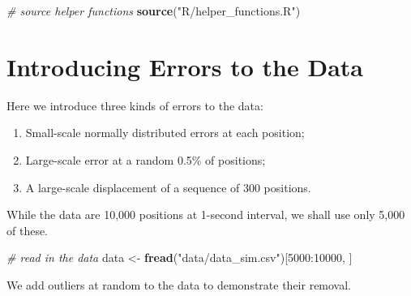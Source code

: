 \documentclass[
]{scrreprt}
\newenvironment{Shaded}{}{}
\newcommand{\CommentTok}[1]{\textcolor[rgb]{0.38,0.63,0.69}{\textit{#1}}}
\newcommand{\DecValTok}[1]{\textcolor[rgb]{0.25,0.63,0.44}{#1}}
\newcommand{\KeywordTok}[1]{\textcolor[rgb]{0.00,0.44,0.13}{\textbf{#1}}}
\newcommand{\NormalTok}[1]{#1}
\newcommand{\OperatorTok}[1]{\textcolor[rgb]{0.40,0.40,0.40}{#1}}
\newcommand{\StringTok}[1]{\textcolor[rgb]{0.25,0.44,0.63}{#1}}
\begin{document}
\begin{Shaded}
\begin{Highlighting}[]
\CommentTok{\# source helper functions}
\KeywordTok{source}\NormalTok{(}\StringTok{"R/helper\_functions.R"}\NormalTok{)}
\end{Highlighting}
\end{Shaded}

\hypertarget{introducing-errors-to-the-data}{%
\section{Introducing Errors to the Data}\label{introducing-errors-to-the-data}}

Here we introduce three kinds of errors to the data:

\begin{enumerate}
\def\labelenumi{\arabic{enumi}.}
\item
  Small-scale normally distributed errors at each position;
\item
  Large-scale error at a random 0.5\% of positions;
\item
  A large-scale displacement of a sequence of 300 positions.
\end{enumerate}

While the data are 10,000 positions at 1-second interval, we shall use only 5,000 of these.

\begin{Shaded}
\begin{Highlighting}[]
\CommentTok{\# read in the data}
\NormalTok{data <{-}}\StringTok{ }\KeywordTok{fread}\NormalTok{(}\StringTok{"data/data\_sim.csv"}\NormalTok{)[}\DecValTok{5000}\OperatorTok{:}\DecValTok{10000}\NormalTok{, ]}
\end{Highlighting}
\end{Shaded}

We add outliers at random to the data to demonstrate their removal.
\end{document}
